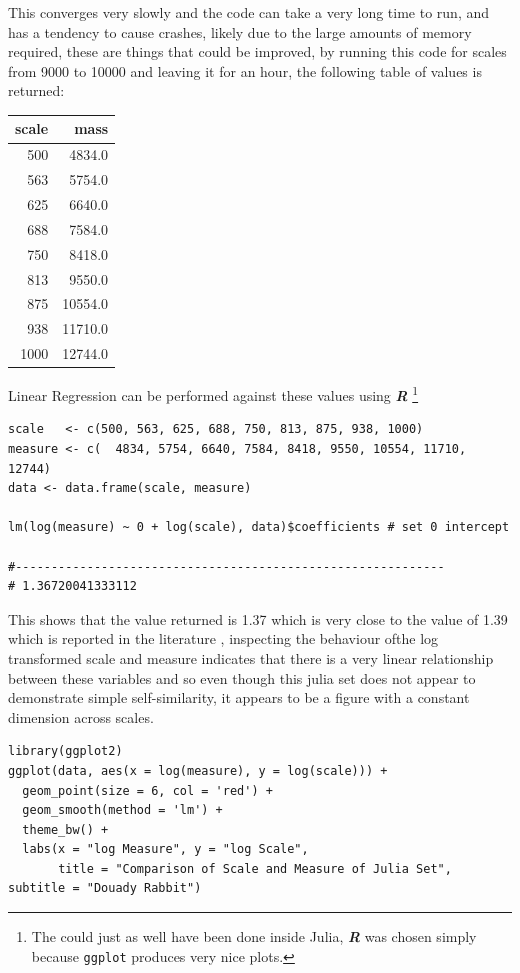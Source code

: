 \documentclass[a4paper,11pt,twoside]{article}
\begin{document}
This converges very slowly and the code can take a very long time to run, and has a tendency to cause crashes, likely due to the large amounts of memory required, these are things that could be improved, by running this code for scales from 9000 to 10000 and leaving it for an hour, the following table of values is returned:

\begin{center}
\begin{tabular}{rr}
scale & mass\\
\hline
500 & 4834.0\\
563 & 5754.0\\
625 & 6640.0\\
688 & 7584.0\\
750 & 8418.0\\
813 & 9550.0\\
875 & 10554.0\\
938 & 11710.0\\
1000 & 12744.0\\
\end{tabular}

\end{center}

Linear Regression can be performed against these values using \textbf{\emph{R}} \footnote{The could just as well have been done inside Julia, \textbf{\emph{R}} was chosen simply because \texttt{ggplot} produces very nice plots.}

\begin{verbatim}
scale   <- c(500, 563, 625, 688, 750, 813, 875, 938, 1000)
measure <- c(  4834, 5754, 6640, 7584, 8418, 9550, 10554, 11710, 12744)
data <- data.frame(scale, measure)

lm(log(measure) ~ 0 + log(scale), data)$coefficients # set 0 intercept

#------------------------------------------------------------
# 1.36720041333112
\end{verbatim}

This shows that the value returned is 1.37 which is very close to the value of
1.39 which is reported in the literature
\cite{mcmullenHausdorffDimensionConformal1998}, inspecting the behaviour ofthe log
transformed scale and measure indicates that there is a very linear relationship
between these variables and so even though this julia set does not appear to demonstrate simple self-similarity, it appears to be a figure with a constant dimension across scales.

\begin{verbatim}
library(ggplot2)
ggplot(data, aes(x = log(measure), y = log(scale))) +
  geom_point(size = 6, col = 'red') +
  geom_smooth(method = 'lm') +
  theme_bw() +
  labs(x = "log Measure", y = "log Scale",
       title = "Comparison of Scale and Measure of Julia Set", subtitle = "Douady Rabbit")
\end{verbatim}
\end{document}
